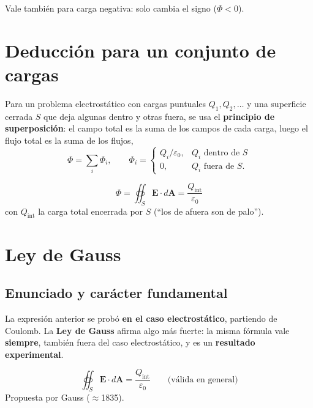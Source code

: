 \documentclass[12pt,a4paper]{article}
\begin{document}
Vale también para carga negativa: solo cambia el signo
($\Phi < 0$).

\section{Deducción para un conjunto de cargas}

Para un problema electrostático con cargas puntuales
$Q_1, Q_2, \dots$ y una superficie cerrada $S$ que deja algunas dentro
y otras fuera, se usa el \textbf{principio de superposición}: el campo
total es la suma de los campos de cada carga, luego el flujo total es
la suma de los flujos,
\[
\Phi = \sum_i \Phi_i,
\qquad
\Phi_i =
\begin{cases}
Q_i/\varepsilon_0, & Q_i \text{ dentro de } S \\
0, & Q_i \text{ fuera de } S .
\end{cases}
\]

\begin{keybox}
  \[
  \boxed{\Phi = \oiint_S \mathbf{E}\cdot d\mathbf{A}
         = \frac{Q_{\text{int}}}{\varepsilon_0}}
  \]
  con $Q_{\text{int}}$ la carga total encerrada por $S$
  (\enquote{los de afuera son de palo}).
\end{keybox}

\section{Ley de Gauss}

\subsection{Enunciado y carácter fundamental}

La expresión anterior se probó \textbf{en el caso electrostático},
partiendo de Coulomb. La \textbf{Ley de Gauss} afirma algo más fuerte:
la misma fórmula vale \textbf{siempre}, también fuera del caso
electrostático, y es un \textbf{resultado experimental}.

\begin{keybox}
  \[
  \boxed{\oiint_S \mathbf{E}\cdot d\mathbf{A}
         = \frac{Q_{\text{int}}}{\varepsilon_0}}
  \qquad \text{(válida en general)}
  \]
  Propuesta por Gauss ($\approx$1835).
\end{keybox}
\end{document}
